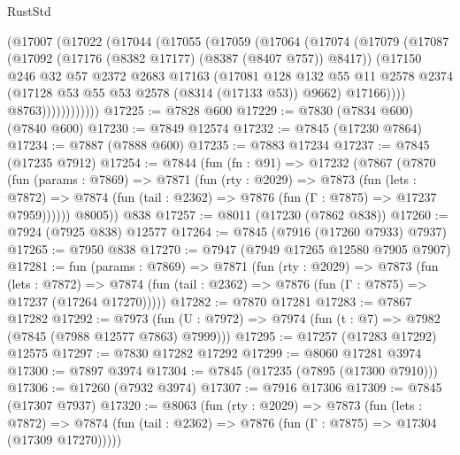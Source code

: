 \begin{lexlean}{RustStd}
\begin{coremodule}
              (@17007
                (@17022
                  (@17044
                    (@17055
                      (@17059
                        (@17064
                          (@17074
                            (@17079
                              (@17087
                                (@17092 (@17176 (@8382 @17177) (@8387 (@8407 @757)) @8417))
                                (@17150
                                  @246
                                  @32
                                  @57
                                  @2372
                                  @2683
                                  @17163
                                  (@17081
                                    @128
                                    @132
                                    @55
                                    @11
                                    @2578
                                    @2374
                                    (@17128 @53 @55 @53 @2578 (@8314 (@17133 @53)) @9662)
                                    @17166))))
                            @8763))))))))))))
@17225 := @7828 @600
@17229 := @7830 (@7834 @600) (@7840 @600)
@17230 := @7849 @12574
@17232 := @7845 (@17230 @7864)
@17234 := @7887 (@7888 @600)
@17235 := @7883 @17234
@17237 := @7845 (@17235 @7912)
@17254 := @7844
    (fun (fn : @91) =>
    @17232
      (@7867
        (@7870
          (fun (params : @7869) =>
          @7871
            (fun (rty : @2029) =>
            @7873
              (fun (lets : @7872) =>
              @7874 (fun (tail : @2362) => @7876 (fun (Γ : @7875) => @17237 @7959))))))
        @8005))
    @838
@17257 := @8011 (@17230 (@7862 @838))
@17260 := @7924 (@7925 @838) @12577
@17264 := @7845 (@7916 (@17260 @7933) @7937)
@17265 := @7950 @838
@17270 := @7947 (@7949 @17265 @12580 @7905 @7907)
@17281 := fun (params : @7869) =>
  @7871
    (fun (rty : @2029) =>
    @7873
      (fun (lets : @7872) =>
      @7874 (fun (tail : @2362) => @7876 (fun (Γ : @7875) => @17237 (@17264 @17270)))))
@17282 := @7870 @17281
@17283 := @7867 @17282
@17292 := @7973
    (fun (U : @7972) => @7974 (fun (t : @7) => @7982 (@7845 (@7988 @12577 @7863) @7999)))
@17295 := @17257 (@17283 @17292) @12575
@17297 := @7830 @17282 @17292
@17299 := @8060 @17281 @3974
@17300 := @7897 @3974
@17304 := @7845 (@17235 (@7895 (@17300 @7910)))
@17306 := @17260 (@7932 @3974)
@17307 := @7916 @17306
@17309 := @7845 (@17307 @7937)
@17320 := @8063
    (fun (rty : @2029) =>
    @7873
      (fun (lets : @7872) =>
      @7874 (fun (tail : @2362) => @7876 (fun (Γ : @7875) => @17304 (@17309 @17270)))))

\end{coremodule}
\end{lexlean}
